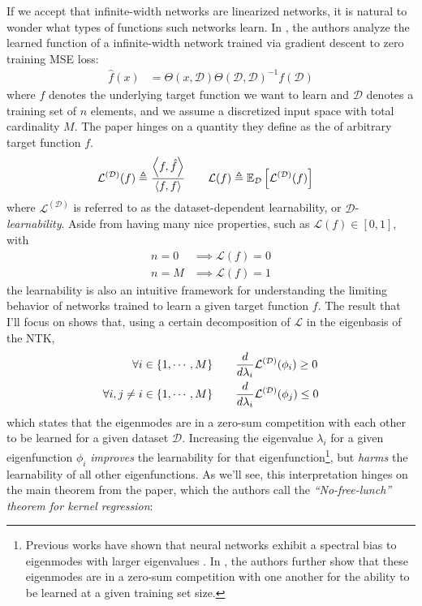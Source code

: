 \documentclass{article}
\newcommand\mc{\mathcal}
\begin{document}
If we accept that infinite-width networks are linearized networks, it is natural to wonder what types of functions such networks learn. In \cite{simon2021}, the authors analyze the learned function of a infinite-width network trained via gradient descent to zero training MSE loss:
\begin{align}
	\hat f(x)
	&= \Theta(x, \mc D) \Theta(\mc D, \mc D)^{-1} f(\mc D) \label{eq:simon-1}
\end{align}
where $f$ denotes the underlying target function we want to learn and $\mc D$ denotes a training set of $n$ elements, and we assume a discretized input space with total cardinality $M$. The paper hinges on a quantity they define as the  of arbitrary target function $f$. 
\begin{align}
	\mathcal L^{(\mc D)}(f)
		&\triangleq \frac{\innerprod{f}{\hat f}}{\innerprod{f}{f}} 
	\qquad 
	\mc L(f) 
		\triangleq \E[\mc D]{\mc L^{(\mc D)}(f)}
\end{align}
where $\mc L^{(\mc D)}$ is referred to as the dataset-dependent learnability, or $\mc D$-\textit{learnability}. Aside from having many nice properties, such as $\mc L(f) \in [0, 1]$, with
\begin{align}
	n = 0 &\implies \mc{L}(f) = 0 \\
	n = M &\implies \mc{L}(f) = 1
\end{align}
the learnability is also an intuitive framework for understanding the limiting behavior of networks trained to learn a given target function $f$. The result that I'll focus on shows that, using a certain decomposition of $\mc L$ in the eigenbasis of the NTK,  
\begin{align}
	\forall i \in \{1, \cdots, M\} \qquad 
	&\deriv{}{\lambda_i} \mc L^{(\mc D)}(\phi_i) \geq 0 \\
	\forall i, j \neq i \in \{1, \cdots, M\}  \qquad 
		&\deriv{}{\lambda_i} \mc L^{(\mc D)}(\phi_{j}) \leq 0
\end{align}
which states that the eigenmodes are in a zero-sum competition with each other to be learned for a given dataset $\mc D$. Increasing the eigenvalue $\lambda_i$ for a given eigenfunction $\phi_i$ \textit{improves} the learnability for that eigenfunction\footnote{Previous works have shown that neural networks exhibit a spectral bias to eigenmodes with larger eigenvalues \cite{canatar2021}. In \cite{simon2021}, the authors further show that these eigenmodes are in a zero-sum competition with one another for the ability to be learned at a given training set size.}, but \textit{harms} the learnability of all other eigenfunctions. As we'll see, this interpretation hinges on the main theorem from the paper, which the authors call the \textit{``No-free-lunch'' theorem for kernel regression}:
\end{document}
